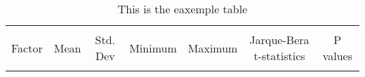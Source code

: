 \documentclass{article}
\begin{document}
\begin{table}[ht]
\caption{This is the eaxemple table}%
\fontsize{10}{10}\selectfont
\centering %
\begin{tabular}{l c c c c c c}%
\hline\hline   \\ [-1.5ex]               %
Factor & Mean & Std. Dev & Minimum & Maximum & Jarque-Bera t-statistics  & P values \\ [0.5ex] %

\hline       \\ [-1.5ex]           %


\end{tabular}
\end{table}
\end{document}
